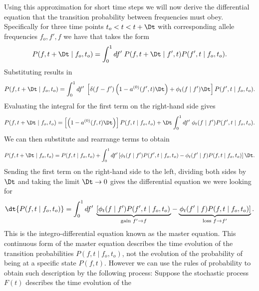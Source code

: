 Using this approximation for short time steps we will now derive the
differential equation that the transition probability between frequencies must
obey. Specifically for three time points $t_o < t < t + \Dt$ with corresponding
allele frequencies $f_o, f', f$ we have that  takes the
form
\begin{equation}
  P(f, t + \Dt \mid f_o, t_o) = \int_0^1 df' \; P(f, t + \Dt \mid f', t)
  P(f', t \mid f_o, t_o).
\end{equation}
Substituting  results in
\begin{equation}
  P(f, t + \Dt \mid f_o, t_o) = \int_0^1 df' \;
  \left[ \delta(f - f') \left( 1 - a^{(0)}(f', t)\Dt \right)
  + \phi_t(f \mid f')\Dt \right]
  P(f', t \mid f_o, t_o).
\end{equation}
Evaluating the integral for the first term on the right-hand side gives
\begin{equation}
  P(f, t + \Dt \mid f_o, t_o) = \left[\left( 1 - a^{(0)}(f, t)\Dt \right)\right]
  P(f, t \mid f_o, t_o) +
  \Dt \int_0^1 df' \; \phi_t(f \mid f') P(f', t \mid f_o, t_o).
\end{equation}
We can then substitute  and rearrange terms to obtain
\begin{equation}
  P(f, t + \Dt \mid f_o, t_o) = P(f, t \mid f_o, t_o)
  + \int_0^1 df' \left[ \phi_t(f \mid f') P(f', t \mid f_o, t_o) -
  \phi_t(f' \mid f) P(f, t \mid f_o, t_o) \right]\Dt.
\end{equation}
Sending the first term on the right-hand side to the left, dividing both sides
by $\Dt$ and taking the limit $\Dt \rightarrow 0$ gives the differential
equation we were looking for
\begin{equation}
  \dt{P(f, t \mid f_o, t_o)} = \int_0^1 df' \;
  \underbrace{
  \left[ \phi_t(f \mid f') P(f', t \mid f_o, t_o) \right.}
  _{\text{gain } f' \rightarrow f}  -
  \underbrace{
  \left. \phi_t(f' \mid f) P(f, t \mid f_o, t_o) \right]}
  _{\text{loss } f \rightarrow f'}.
  \label{eq_master_eq_trans}
\end{equation}
This is the integro-differential equation known as the master equation. This
continuous form of the master equation describes the time evolution of the
transition probabilities $P(f, t \mid f_o, t_o)$, not the evolution of the
probability of being at a specific state $P(f, t)$. However we can use the
rules of probability to obtain such description by the following process:
Suppose the stochastic process $F(t)$ describes the time evolution of the

